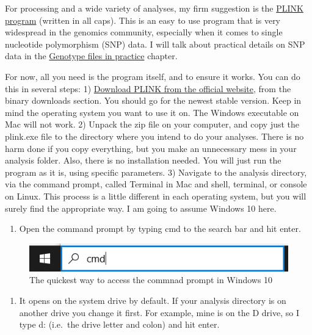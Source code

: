 \documentclass[]{book}
\providecommand{\tightlist}{%
  \setlength{\itemsep}{0pt}\setlength{\parskip}{0pt}}
\begin{document}
For processing and a wide variety of analyses, my firm suggestion is the
\href{https://www.cog-genomics.org/plink/}{PLINK program} (written in
all caps). This is an easy to use program that is very widespread in the
genomics community, especially when it comes to single nucleotide
polymorphism (SNP) data. I will talk about practical details on SNP data
in the \protect\hyperlink{genotype-files-in-practice}{Genotype files in
practice} chapter.

For now, all you need is the program itself, and to ensure it works. You
can do this in several steps: 1)
\href{https://www.cog-genomics.org/plink/}{Download PLINK from the
official website}, from the binary downloads section. You should go for
the newest stable version. Keep in mind the operating system you want to
use it on. The Windows executable on Mac will not work. 2) Unpack the
zip file on your computer, and copy just the plink.exe file to the
directory where you intend to do your analyses. There is no harm done if
you copy everything, but you make an unnecessary mess in your analysis
folder. Also, there is no installation needed. You will just run the
program as it is, using specific parameters. 3) Navigate to the analysis
directory, via the command prompt, called Terminal in Mac and shell,
terminal, or console on Linux. This process is a little different in
each operating system, but you will surely find the appropriate way. I
am going to assume Windows 10 here.

\begin{enumerate}
\def\labelenumi{\alph{enumi})}
\tightlist
\item
  Open the command prompt by typing cmd to the search bar and hit enter.
\end{enumerate}

\begin{figure}
\includegraphics[width=6.9in]{images/4-1-cmdWinSearchBar} \caption{The quickest way to access the commnad prompt in Windows 10}\label{fig:fig4-1}
\end{figure}

\begin{enumerate}
\def\labelenumi{\alph{enumi})}
\setcounter{enumi}{1}
\tightlist
\item
  It opens on the system drive by default. If your analysis directory is
  on another drive you change it first. For example, mine is on the D
  drive, so I type d: (i.e.~the drive letter and colon) and hit enter.
\end{enumerate}
\end{document}
